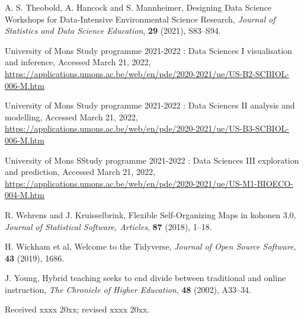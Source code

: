 \documentclass{aims} %
\theoremstyle{definition}
\begin{document}
\begin{thebibliography}{99}
     \newblock A. S. Theobold, A. Hancock and S. Mannheimer,
     \newblock  Designing Data Science Workshops for Data-Intensive Environmental Science Research,
     \newblock \emph{Journal of Statistics and Data Science Education}, \textbf{29} (2021), S83--S94.

    \newblock University of Mons
    \newblock Study programme 2021-2022 : Data Sciences I visualisation and inference,
    \newblock Accessed March 21, 2022,
    \newblock \url{https://applications.umons.ac.be/web/en/pde/2020-2021/ue/US-B2-SCBIOL-006-M.htm}

    \newblock University of Mons
    \newblock Study programme 2021-2022 : Data Sciences II analysis and modelling,
    \newblock Accessed March 21, 2022,
    \newblock \url{https://applications.umons.ac.be/web/en/pde/2020-2021/ue/US-B3-SCBIOL-006-M.htm}

    \newblock University of Mons
    \newblock SStudy programme 2021-2022 : Data {Sciences} {III} exploration and prediction,
    \newblock Accessed March 21, 2022,
    \newblock \url{https://applications.umons.ac.be/web/en/pde/2020-2021/ue/US-M1-BIOECO-004-M.htm}

     \newblock R. Wehrens and J. Kruisselbrink,
     \newblock  Flexible Self-Organizing Maps in kohonen 3.0,
     \newblock \emph{Journal of Statistical Software, Articles}, \textbf{87} (2018), 1--18.

     \newblock H. Wickham et al,
     \newblock  Welcome to the Tidyverse,
     \newblock \emph{Journal of Open Source Software}, \textbf{43} (2019), 1686.

     \newblock  J. Young,
     \newblock Hybrid teaching seeks to end divide between traditional and online instruction,
     \newblock \emph{The Chronicle of Higher Education}, \textbf{48} (2002), A33--34.

\end{thebibliography}

\medskip
Received xxxx 20xx; revised xxxx 20xx.
\medskip
\end{document}
